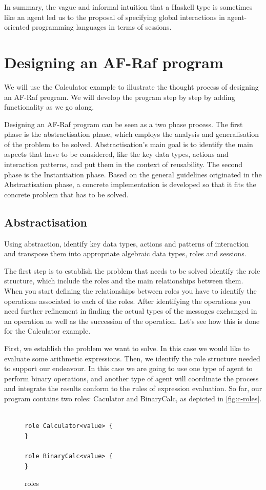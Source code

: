 \documentclass[a4paper,12pt,oneside,fleqn]{book} %
\begin{document}
In summary, the vague and informal intuition that a Haskell type is
sometimes like an agent led us to the proposal of specifying global
interactions in agent-oriented programming languages in terms of sessions.
\section{Designing an AF-Raf program} %
We will use the Calculator example to illustrate the thought process of
designing an AF-Raf program. We will develop the program step by step by
adding functionality as we go along.

Designing an AF-Raf program can be seen as a two phase process. The first
phase is the abstractisation phase, which employs the analysis and
generalisation of the problem to be solved. Abstractisation's main goal is to
identify the main aspects that have to be considered, like the key data
types, actions and interaction patterns, and put them in the context of
reusability. The second phase is the Instantiation phase. Based on the
general guidelines originated in the Abstractisation phase, a concrete
implementation is developed so that it fits the concrete problem that has
to be solved.
\subsection{Abstractisation} %
Using abstraction, identify key data types, actions and patterns of
interaction and transpose them into appropriate algebraic data types, roles
and sessions.

The first step is to establish the problem that needs to be solved identify
the role structure, which include the roles and the main relationships
between them. When you start defining the relationships between roles you
have to identify the operations associated to each of the roles. After
identifying the operations you need further refinement in finding the
actual types of the messages exchanged in an operation as well as the
succession of the operation. Let's see how this is done for the Calculator
example.

First, we establish the problem we want to solve. In this case we would
like to evaluate some arithmetic expressions. Then, we identify the role
structure needed to support our endeavour. In this case we are going to use
one type of agent to perform binary operations, and another type of agent
will coordinate the process and integrate the results conform to the rules
of expression evaluation. So far, our program contains two roles: Caculator
and BinaryCalc, as depicted in \autoref{fig:c-roles}.
\begin{figure}\footnotesize %
\begin{verbatim}

role Calculator<value> {
}

role BinaryCalc<value> {
}

\end{verbatim}
\caption{roles}
\label{fig:c-roles}
\end{figure} %
\end{document}

